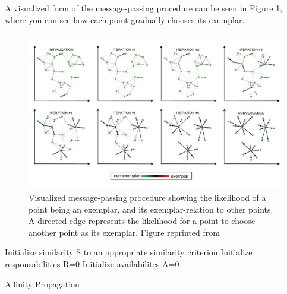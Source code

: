 \documentclass[11pt,a4paper]{article}
\begin{document}
A visualized form of the message-passing procedure can be seen in Figure \ref{fig:iterations}, where you can see how each point gradually chooses its exemplar.
\begin{figure}[h!]
	\centering
	\includegraphics[width=\textwidth]{../figures/frey-dueck-cluster.jpg}
	\caption{Visualized message-passing procedure \cite{frey2007clustering} showing the likelihood of a point being an exemplar, and its exemplar-relation to other points. A directed edge represents the likelihood for a point to choose another point as its exemplar. Figure reprinted from \cite[p.~973]{frey2007clustering}}
	\label{fig:iterations}
\end{figure}

\begin{algorithm}[h!]
	\label{lst:pseudoap}
	Initialize similarity S to an appropriate similarity criterion\;
	Initialize responsabilities R=0\;
	Initialize availabilites A=0\;
	\caption{Affinity Propagation}
\end{algorithm}
\end{document}
